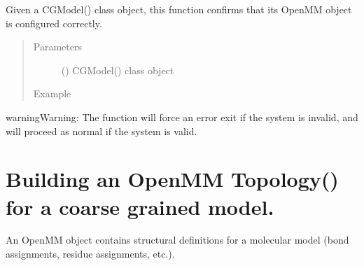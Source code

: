 \documentclass[letterpaper,12pt,english,openany,oneside]{sphinxmanual}
\begin{document}
\begin{fulllineitems}
\label{\detokenize{build:build.cg_build.verify_system}}
Given a CGModel() class object, this function confirms that its OpenMM  object is configured correctly.
\begin{quote}\begin{description}
\item[{Parameters}] \leavevmode
{} () \textendash{} CGModel() class object

\item[{Example}] \leavevmode
\end{description}\end{quote}

\begin{sphinxVerbatim}[commandchars=\\\{\}]
   
  
\end{sphinxVerbatim}

\begin{sphinxadmonition}{warning}{Warning:}
The function will force an error exit if the system is invalid, and will proceed as normal if the system is valid.
\end{sphinxadmonition}

\end{fulllineitems}


\newpage


\section{Building an OpenMM Topology() for a coarse grained model.}
\label{\detokenize{build:building-an-openmm-topology-for-a-coarse-grained-model}}
An OpenMM  object contains structural definitions for a molecular model (bond assignments, residue assignments, etc.).
\end{document}
